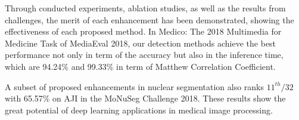 \begin{EnAbstract}
\pagebreak
Through conducted experiments, ablation studies, as well as the results from challenges, the merit of each enhancement has been demonstrated, showing the effectiveness of each proposed method. In Medico: The 2018 Multimedia for Medicine Task of MediaEval 2018, our detection methods achieve the best performance not only in term of the accuracy but also in the inference time, which are 94.24\% and 99.33\% in term of Matthew Correlation Coefficient.

A subset of proposed enhancements in nuclear segmentation also ranks $11^{th}/32$ with 65.57\% on AJI in the MoNuSeg Challenge 2018. These results show the great potential of deep learning applications in medical image processing.







\end{EnAbstract}